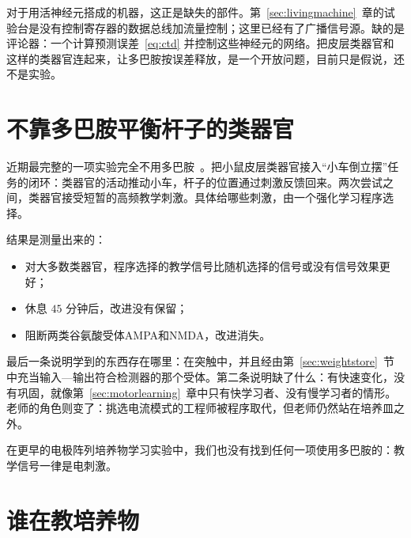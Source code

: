 对于用活神经元搭成的机器，这正是缺失的部件。第~\ref{sec:livingmachine}~章的试验台是没有控制寄存器的数据总线加流量控制；这里已经有了广播信号源。缺的是评论器：一个计算预测误差~\eqref{eq:ctd} 并控制这些神经元的网络。把皮层类器官和这样的类器官连起来，让多巴胺按误差释放，是一个开放问题，目前只是假说，还不是实验。

\section{不靠多巴胺平衡杆子的类器官}
\label{sec:cartpole}

近期最完整的一项实验完全不用多巴胺~\cite{Robbins2026}。把小鼠皮层类器官接入“小车倒立摆”任务的闭环：类器官的活动推动小车，杆子的位置通过刺激反馈回来。两次尝试之间，类器官接受短暂的高频教学刺激。具体给哪些刺激，由一个强化学习程序选择。

结果是测量出来的：
\begin{itemize}
\item 对大多数类器官，程序选择的教学信号比随机选择的信号或没有信号效果更好；
\item 休息 $45$ 分钟后，改进没有保留；
\item 阻断两类谷氨酸受体AMPA和NMDA，改进消失。
\end{itemize}

最后一条说明学到的东西存在哪里：在突触中，并且经由第~\ref{sec:weightstore}~节中充当输入—输出符合检测器的那个受体。第二条说明缺了什么：有快速变化，没有巩固，就像第~\ref{sec:motorlearning}~章中只有快学习者、没有慢学习者的情形。老师的角色则变了：挑选电流模式的工程师被程序取代，但老师仍然站在培养皿之外。

在更早的电极阵列培养物学习实验中，我们也没有找到任何一项使用多巴胺的：教学信号一律是电刺激。

\section{谁在教培养物}

